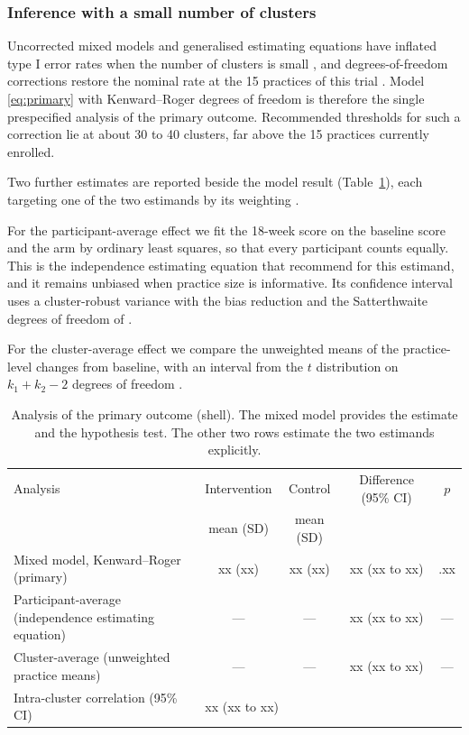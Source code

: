 \documentclass[11pt,a4paper]{article}
\begin{document}
\subsubsection{Inference with a small number of clusters}
\label{sec:smallk}

Uncorrected mixed models and generalised estimating equations have inflated
type I error rates when the number of clusters is small
\citep{taljaard2016, kahan2016}, and degrees-of-freedom corrections restore
the nominal rate at the 15 practices of this trial
\citep{leyrat2018}. Model \eqref{eq:primary} with Kenward--Roger
degrees of freedom is therefore the single prespecified analysis of the
primary outcome. Recommended thresholds for such a correction lie at about
30 \citep{billot2024} to 40 \citep{hemming2023} clusters, far above the 15
practices currently enrolled.

Two further estimates are reported beside the model result
(Table~\ref{tab:prim}), each targeting one of the two estimands by its
weighting \citep{hayes2017, kahan2023}.

For the participant-average effect we fit the 18-week score on the baseline
score and the arm by ordinary least squares, so that every participant
counts equally. This is the independence estimating equation that
\citet{kahan2023} recommend for this estimand, and it remains unbiased when
practice size is informative. Its confidence interval uses a cluster-robust
variance with the bias reduction and the Satterthwaite degrees of freedom of
\citet{bell2002}.

For the cluster-average effect we compare the unweighted means of the
practice-level changes from baseline, with an interval from the $t$
distribution on $k_1 + k_2 - 2$ degrees of freedom \citep[section
10.3.2]{hayes2017}.

\begin{table}[ht]
\centering\small
\caption{Analysis of the primary outcome (shell). The mixed model provides the
estimate and the hypothesis test. The other two rows estimate the two
estimands explicitly.}
\label{tab:prim}
\begin{tabularx}{\textwidth}{Xcccc}
\toprule
Analysis & Intervention & Control & Difference (95\% CI) & $p$\\
& mean (SD) & mean (SD) & &\\
\midrule
Mixed model, Kenward--Roger (primary) & xx (xx) & xx (xx) & xx (xx to xx) & .xx\\
Participant-average (independence estimating equation) & --- & --- & xx (xx to xx) & ---\\
Cluster-average (unweighted practice means) & --- & --- & xx (xx to xx) & ---\\
\midrule
Intra-cluster correlation (95\% CI) & \multicolumn{4}{l}{xx (xx to xx)}\\
\bottomrule
\end{tabularx}
\end{table}
\end{document}

